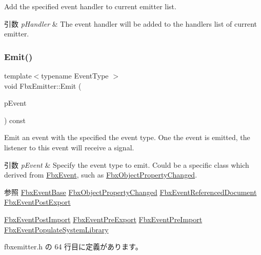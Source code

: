 Add the specified event handler to current emitter list. 
\begin{DoxyParams}{引数}
{\em p\+Handler} & The event handler will be added to the handlers list of current emitter. \\
\hline
\end{DoxyParams}
\mbox{\label{class_fbx_emitter_ad541e3b06c0beeab71fcf066fc44c78d}} 
\subsubsection{\texorpdfstring{Emit()}{Emit()}}
{\footnotesize\ttfamily template$<$typename Event\+Type $>$ \\
void Fbx\+Emitter\+::\+Emit (\begin{DoxyParamCaption}\item[{const Event\+Type \&}]{p\+Event }\end{DoxyParamCaption}) const\hspace{0.3cm}{\ttfamily [inline]}}

Emit an event with the specified the event type. One the event is emitted, the listener to this event will receive a signal. 
\begin{DoxyParams}{引数}
{\em p\+Event} & Specify the event type to emit. Could be a specific class which derived from \hyperlink{class_fbx_event}{Fbx\+Event}, such as \hyperlink{class_fbx_object_property_changed}{Fbx\+Object\+Property\+Changed}. \\
\hline
\end{DoxyParams}
\begin{DoxySeeAlso}{参照}
\hyperlink{class_fbx_event_base}{Fbx\+Event\+Base} \hyperlink{class_fbx_object_property_changed}{Fbx\+Object\+Property\+Changed} \hyperlink{class_fbx_event_referenced_document}{Fbx\+Event\+Referenced\+Document} \hyperlink{class_fbx_event_post_export}{Fbx\+Event\+Post\+Export} 

\hyperlink{class_fbx_event_post_import}{Fbx\+Event\+Post\+Import} \hyperlink{class_fbx_event_pre_export}{Fbx\+Event\+Pre\+Export} \hyperlink{class_fbx_event_pre_import}{Fbx\+Event\+Pre\+Import} \hyperlink{class_fbx_event_populate_system_library}{Fbx\+Event\+Populate\+System\+Library} 
\end{DoxySeeAlso}


 fbxemitter.\+h の 64 行目に定義があります。

\mbox{\label{class_fbx_emitter_a9d5e8f773a85bd9f7a88d9f01eb5463d}} 

